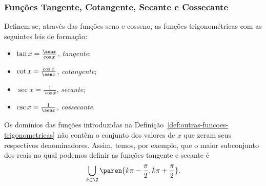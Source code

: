 \subsubsection{Funções Tangente, Cotangente, Secante e Cossecante}

\begin{definition}
\label{def:outras-funcoes-trigonometricas}
    Definem-se, através das funções seno e cosseno, as funções
trigonométricas com as seguintes leis de formação:
\begin{itemize}
  \item $\tan x = \frac {\sen x}{\cos x}$, \emph{tangente};
  \item $\cot x = \frac {\cos x}{\sen x}$, \emph{cotangente};
  \item $\sec x = \frac {1}{\cos x}$, \emph{secante};
  \item $\csc x = \frac {1}{\sen x}$, \emph{cossecante}.
\end{itemize}
\end{definition}

\begin{remark}
    Os domínios das funções introduzidas na Definição~\ref{def:outras-funcoes-trigonometricas} não contêm o conjunto dos valores de $x$
que zeram seus respectivos denominadores. Assim, temos, por exemplo, que o maior subconjunto dos reais no qual podemos definir
as funções tangente e secante é $$\bigcup_{k \in \Z} \paren{k \pi -
\frac {\pi} 2, k \pi + \frac {\pi} 2}.$$
\end{remark}

\begin{tve}
\end{tve}

\begin{tve}
\end{tve}